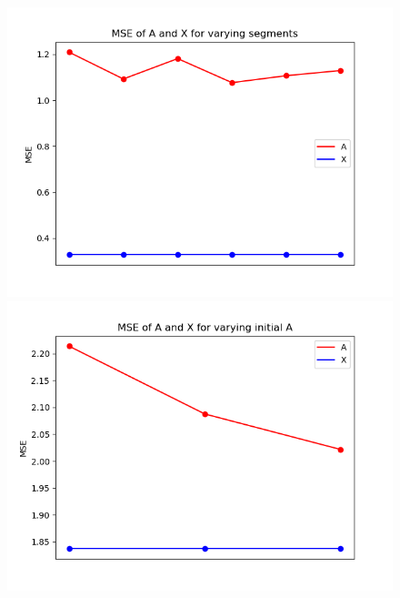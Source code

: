 \begin{figure}[H]
\begin{minipage}[t]{.45\textwidth}
    \end{minipage}
    \begin{minipage}[t]{.45\textwidth}
        \centering
		\includegraphics[scale=0.5]{figures/chapter6/Mix_Error_vary_covseg_m8_k16_L1000_RealA.png}
    \end{minipage} 
    \hfill
    \begin{minipage}[t]{.45\textwidth}
        \centering
		\includegraphics[scale=0.5]{figures/chapter6/AR_Error_initial_A_m8_k16_L1000_RealA.png}
    \end{minipage}
\caption{}
\label{fig:seg}
\end{figure}
